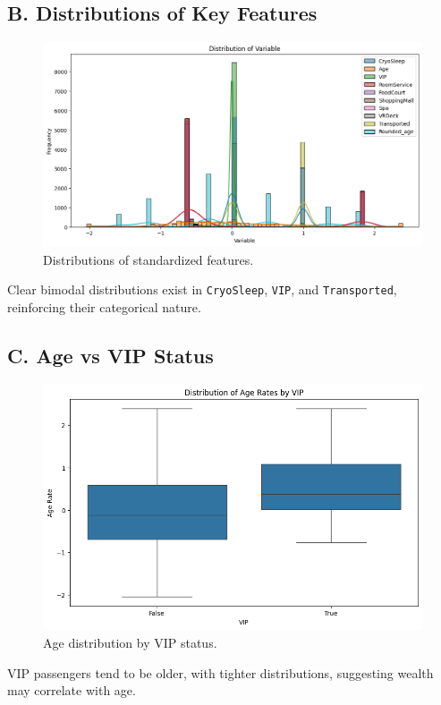 \documentclass[12pt]{article}
\begin{document}
\subsection*{B. Distributions of Key Features}
\begin{figure}[H]
    \centering
    \includegraphics[width=0.9\linewidth]{output2.png}
    \caption{Distributions of standardized features.}
\end{figure}
\noindent
Clear bimodal distributions exist in \texttt{CryoSleep}, \texttt{VIP}, and \texttt{Transported}, reinforcing their categorical nature.

\subsection*{C. Age vs VIP Status}
\begin{figure}[H]
    \centering
    \includegraphics[width=0.6\linewidth]{output3.png}
    \caption{Age distribution by VIP status.}
\end{figure}
\noindent
VIP passengers tend to be older, with tighter distributions, suggesting wealth may correlate with age.
\end{document}
